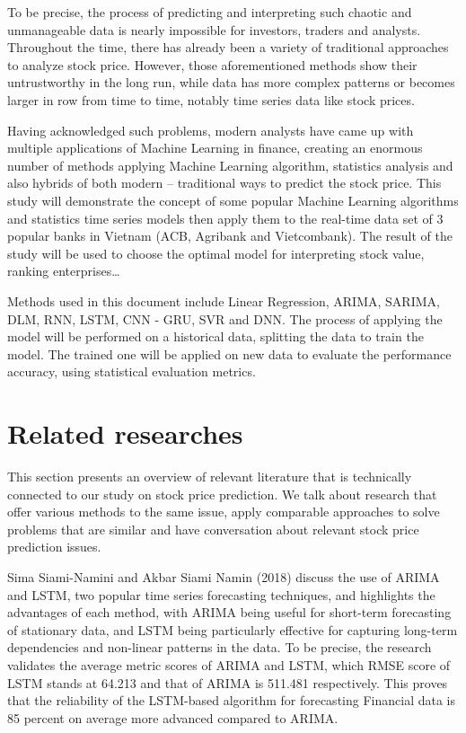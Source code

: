 \documentclass{ieeeojies}
\begin{document}
    To be precise, the process of predicting and interpreting such chaotic and unmanageable data is nearly impossible for investors, traders and analysts. Throughout the time, there has already been a variety of traditional approaches to analyze stock price. However, those aforementioned methods show their untrustworthy in the long run, while data has more complex patterns or becomes larger in row from time to time, notably time series data like stock prices. 
    
    Having acknowledged such problems, modern analysts have came up with multiple applications of Machine Learning in finance, creating an enormous number of methods applying Machine Learning algorithm, statistics analysis and also hybrids of both modern – traditional ways to predict the stock price. This study will demonstrate the concept of some popular Machine Learning algorithms and statistics time series models then apply them to the real-time data set of 3 popular banks in Vietnam (ACB, Agribank and Vietcombank). The result of the study will be used to choose the optimal model for interpreting stock value, ranking enterprises…
    
    Methods used in this document include Linear Regression, ARIMA, SARIMA, DLM, RNN, LSTM, CNN - GRU, SVR and DNN. The process of applying the model will be performed on a historical data, splitting the data to train the model. The trained one will be applied on new data to evaluate the performance accuracy, using statistical evaluation metrics.




\section{Related researches}
\hspace{0.4cm}This section presents an overview of relevant literature that is technically connected to our study on stock price prediction. We talk about research that offer various methods to the same issue, apply comparable approaches to solve problems that are similar and have conversation about relevant stock price prediction issues.

Sima Siami-Namini and Akbar Siami Namin (2018) \cite{1} discuss the use of ARIMA and LSTM, two popular time series forecasting techniques, and highlights the advantages of each method, with ARIMA being useful for short-term forecasting of stationary data, and LSTM being particularly effective for capturing long-term dependencies and non-linear patterns in the data. To be precise, the research validates the average metric scores of ARIMA and LSTM, which RMSE score of LSTM stands at 64.213 and that of ARIMA is 511.481 respectively. This proves that the reliability of the LSTM-based algorithm for forecasting Financial data is 85 percent on average more advanced compared to ARIMA.
\end{document}
